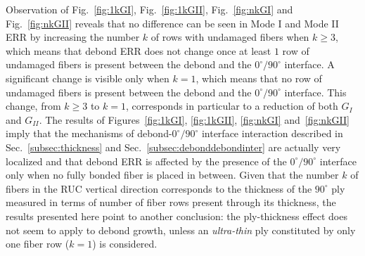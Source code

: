 \documentclass[review]{elsarticle}
\begin{document}
Observation of Fig.~\ref{fig:1kGI}, Fig.~\ref{fig:1kGII}, Fig.~\ref{fig:nkGI} and Fig.~\ref{fig:nkGII} reveals that no difference can be seen in Mode I and Mode II ERR by increasing the number $k$ of rows with undamaged fibers when $k\geq3$, which means that debond ERR does not change once at least $1$ row of undamaged fibers is present between the debond and the $0^{\circ}/90^{\circ}$ interface. A significant change is visible only when $k=1$, which means that no row of undamaged fibers is present between the debond and the $0^{\circ}/90^{\circ}$ interface. This change, from $k\geq3$ to $k=1$, corresponds in particular to a reduction of both $G_{I}$ and $G_{II}$. The results of Figures~\ref{fig:1kGI}, \ref{fig:1kGII}, \ref{fig:nkGI} and~\ref{fig:nkGII} imply that the mechanisms of debond-$0^{\circ}/90^{\circ}$ interface interaction described in Sec.~\ref{subsec:thickness} and Sec.~\ref{subsec:debonddebondinter} are actually very localized and that debond ERR is affected by the presence of the $0^{\circ}/90^{\circ}$ interface only when no fully bonded fiber is placed in between. Given that the number $k$ of fibers in the RUC vertical direction corresponds to the thickness of the $90^{\circ}$ ply measured in terms of number of fiber rows present through its thickness, the results presented here point to another conclusion: the ply-thickness effect does not seem to apply to debond growth, unless an \textit{ultra-thin} ply constituted by only one fiber row ($k=1$) is considered.
\end{document}

